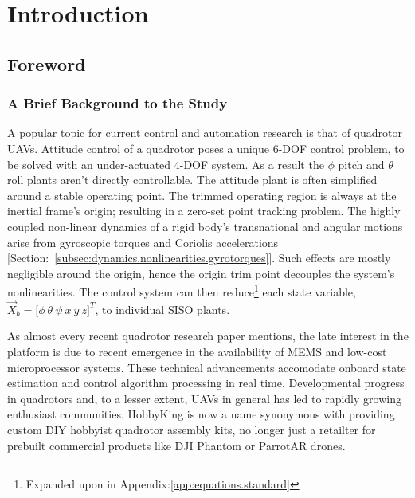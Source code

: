 \chapter{Introduction}
\label{ch:intro}
\section{Foreword}
\label{sec:intro.foreword}
\subsection{A Brief Background to the Study}
\label{subsec:intro.foreword.background}
A popular topic for current control and automation research is that of quadrotor UAVs. Attitude control of a quadrotor poses a unique 6-DOF control problem, to be solved with an under-actuated 4-DOF system. As a result the $\phi$ pitch and $\theta$ roll plants aren't directly controllable. The attitude plant is often simplified around a stable operating point. The trimmed operating region is always at the inertial frame's origin; resulting in a zero-set point tracking problem. The highly coupled non-linear dynamics of a rigid body's transnational and angular motions arise from gyroscopic torques and Coriolis accelerations [Section:~\ref{subsec:dynamics.nonlinearities.gyrotorques}]. Such effects are mostly negligible around the origin, hence the origin trim point decouples the system's nonlinearities. The control system can then reduce\footnote{Expanded upon in Appendix:\ref{app:equations.standard}} each state variable, $\vec{X}_b=\big[\phi~\theta~\psi~x~y~z\big]^T$, to individual SISO plants.
\par
As almost every recent quadrotor research paper mentions, the late interest in the platform is due to recent emergence in the availability of MEMS and low-cost microprocessor systems. These technical advancements accomodate onboard state estimation and control algorithm processing in real time. Developmental progress in quadrotors and, to a lesser extent, UAVs in general has led to rapidly growing enthusiast communities. HobbyKing\cite{hobbyking} is now a name synonymous with providing custom DIY hobbyist quadrotor assembly kits, no longer just a retailter for prebuilt commercial products like DJI Phantom or ParrotAR drones.
